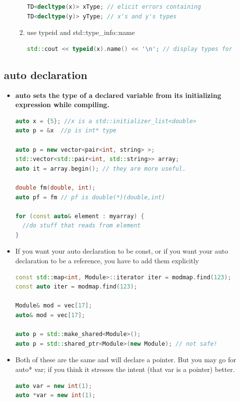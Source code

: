 \documentclass[a4paper,12pt,twoside]{book}
\begin{document}
\begin{itemize}
\begin{enumerate}
\begin{lstlisting}[frame=single, language=c++]
TD<decltype(x)> xType; // elicit errors containing
TD<decltype(y)> yType; // x's and y's types
\end{lstlisting}
\item use typeid and std::type\_info::name
\begin{lstlisting}[frame=single, language=c++]
std::cout << typeid(x).name() << '\n'; // display types for
\end{lstlisting}

\end{enumerate}

\end{itemize}

\subsection{auto declaration}
\begin{itemize}

\item \textbf{auto sets the type of a declared variable from its initializing expression while compiling.}
\begin{lstlisting}[frame=single, language=c++]
auto x = {5}; //x is a std::initializer_list<double>
auto p = &x  //p is int* type

auto p = new vector<pair<int, string> >;
std::vector<std::pair<int, std::string>> array;
auto it = array.begin(); // they are more useful.

double fm(double, int);
auto pf = fm // pf is double(*)(double,int)

for (const auto& element : myarray) {
  //do stuff that reads from element
}
\end{lstlisting}

\item If you want your auto declaration to be const, or if you want your auto declaration to be a reference, you have to add them explicitly

\begin{lstlisting}[frame=single, language=c++]
const std::map<int, Module>::iterator iter = modmap.find(123);
const auto iter = modmap.find(123);

Module& mod = vec[17];
auto& mod = vec[17];

auto p = std::make_shared<Module>();
auto p = std::shared_ptr<Module>(new Module); // not safe!
\end{lstlisting}

\item Both of these are the same and will declare a pointer. But you may go for auto* var; if you think it stresses the intent (that var is a pointer) better.
\begin{lstlisting}[frame=single, language=c++]
auto var = new int(1);
auto *var = new int(1);
\end{lstlisting}



\end{itemize}
\end{document}
